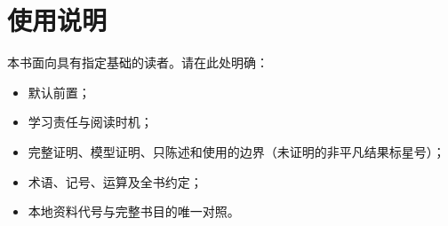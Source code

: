 \chapter*{使用说明}

本书面向具有指定基础的读者。请在此处明确：

\begin{itemize}
  \item 默认前置；
  \item 学习责任与阅读时机；
  \item 完整证明、模型证明、只陈述和使用的边界（未证明的非平凡结果标星号）；
  \item 术语、记号、运算及全书约定；
  \item 本地资料代号与完整书目的唯一对照。
\end{itemize}
